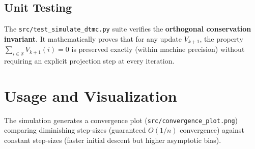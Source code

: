 \documentclass[11pt,a4paper]{article}
\begin{document}
\subsection{Unit Testing}
The \texttt{src/test\_simulate\_dtmc.py} suite verifies the \textbf{orthogonal conservation invariant}. It mathematically proves that for any update $V_{k+1}$, the property $\sum_{i \in \mathcal{S}} V_{k+1}(i) = 0$ is preserved exactly (within machine precision) without requiring an explicit projection step at every iteration.

\section{Usage and Visualization}
The simulation generates a convergence plot (\texttt{src/convergence\_plot.png}) comparing diminishing step-sizes (guaranteed $O(1/n)$ convergence) against constant step-sizes (faster initial descent but higher asymptotic bias).
\end{document}
